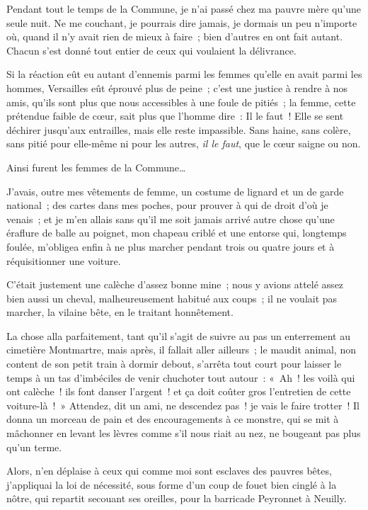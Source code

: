 \documentclass[french,twoside]{book} %
\newcommand\chaptercont{} %
\begin{document}
\chaptercont
\noindent Pendant tout le temps de la Commune, je n’ai passé chez ma pauvre mère qu’une seule nuit. Ne me couchant, je pourrais dire jamais, je dormais un peu n’importe où, quand il n’y avait rien de mieux à faire ; bien d’autres en ont fait autant. Chacun s’est donné tout entier de ceux qui voulaient la délivrance.\par
Si la réaction eût eu autant d’ennemis parmi les femmes qu’elle en avait parmi les hommes, Versailles eût éprouvé plus de peine ; c’est une justice à rendre à nos amis, qu’ils sont plus que nous accessibles à une foule de pitiés ; la femme, cette prétendue faible de cœur, sait plus que l’homme dire : Il le faut ! Elle se sent déchirer jusqu’aux entrailles, mais elle reste impassible. Sans haine, sans colère, sans pitié pour elle-même ni pour les autres, \emph{il le faut}, que le cœur saigne ou non.\par
Ainsi furent les femmes de la Commune…\par
 J’avais, outre mes vêtements de femme, un costume de lignard et un de garde national ; des cartes dans mes poches, pour prouver à qui de droit d’où je venais ; et je m’en allais sans qu’il me soit jamais arrivé autre chose qu’une éraflure de balle au poignet, mon chapeau criblé et une entorse qui, longtemps foulée, m’obligea enfin à ne plus marcher pendant trois ou quatre jours et à réquisitionner une voiture.\par
C’était justement une calèche d’assez bonne mine ; nous y avions attelé assez bien aussi un cheval, malheureusement habitué aux coups ; il ne voulait pas marcher, la vilaine bête, en le traitant honnêtement.\par
La chose alla parfaitement, tant qu’il s’agit de suivre au pas un enterrement au cimetière Montmartre, mais après, il fallait aller ailleurs ; le maudit animal, non content de son petit train à dormir debout, s’arrêta tout court pour laisser le temps à un tas d’imbéciles de venir chuchoter tout autour : « Ah ! les voilà qui ont calèche ! ils font danser l’argent ! et ça doit coûter gros l’entretien de cette voiture-là ! » Attendez, dit un ami, ne descendez pas ! je vais le faire trotter ! Il donna un morceau de pain et des encouragements à ce monstre, qui se mit à mâchonner en levant les lèvres comme s’il  nous riait au nez, ne bougeant pas plus qu’un terme.\par
Alors, n’en déplaise à ceux qui comme moi sont esclaves des pauvres bêtes, j’appliquai la loi de nécessité, sous forme d’un coup de fouet bien cinglé à la nôtre, qui repartit secouant ses oreilles, pour la barricade Peyronnet à Neuilly.\par
\end{document}
